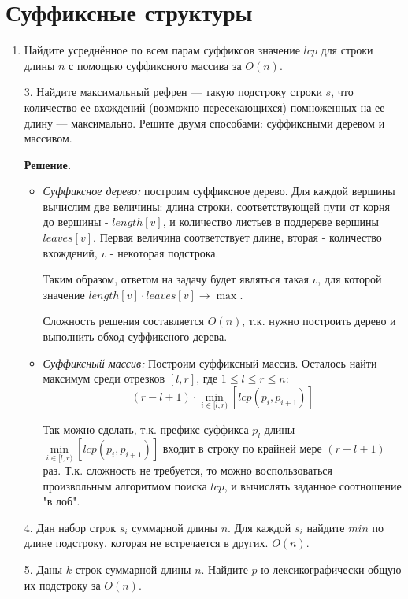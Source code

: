 \section*{Суффиксные структуры}
\begin{enumerate}
	\item Найдите усреднённое по всем парам суффиксов значение $lcp$ для строки длины $n$ с помощью	суффиксного массива за $O(n)$.
	\item[3.] Найдите максимальный рефрен — такую подстроку строки $s$, что количество ее вхождений (возможно пересекающихся) помноженных на ее длину — максимально. Решите двумя способами: суффиксными деревом и массивом.
	
	\textbf{Решение.} 
	
	\begin{itemize}
		\item \textit{Суффиксное дерево:} построим суффиксное дерево. Для каждой вершины вычислим две величины: длина 
		строки, соответствующей пути от корня до вершины - $length[v]$, и количество листьев в поддереве вершины 
		$leaves[v]$. Первая величина соответствует длине, вторая - количество вхождений, $v$ - некоторая подстрока. 
		
		Таким образом, ответом на задачу будет являться такая $v$, для которой значение $length[v] \cdot leaves[v] 
		\to \max$.
		
		Сложность решения составляется $O(n)$, т.к. нужно построить дерево и выполнить обход суффиксного дерева.
		
		\item \textit{Суффиксный массив:} Построим суффиксный массив. Осталось найти максимум среди отрезков $[l, r]$, где $1 \leq l \leq r \leq n$:
		\begin{equation*}
			(r - l + 1) \cdot \min \limits_{i \in [l, r)} \left[ lcp(p_i, p_{i + 1}) \right]
		\end{equation*}
		
		Так можно сделать, т.к. префикс суффикса $p_l$ длины $\min \limits_{i \in [l, r)} \left[ lcp(p_i, p_{i + 1}) \right]$ входит в строку по крайней мере $(r - l + 1)$ раз. Т.к. сложность не требуется, то можно воспользоваться произвольным алгоритмом поиска $lcp$, и вычислять заданное соотношение "в лоб".
		
	\end{itemize}
	\item[4.] Дан набор строк $s_i$ суммарной длины $n$. Для каждой $s_i$ найдите $min$ по длине подстроку, которая не встречается в других. $O(n)$.
	\item[5.] Даны $k$ строк суммарной длины $n$. Найдите $p$-ю лексикографически общую их подстроку за $O(n)$.
\end{enumerate}
